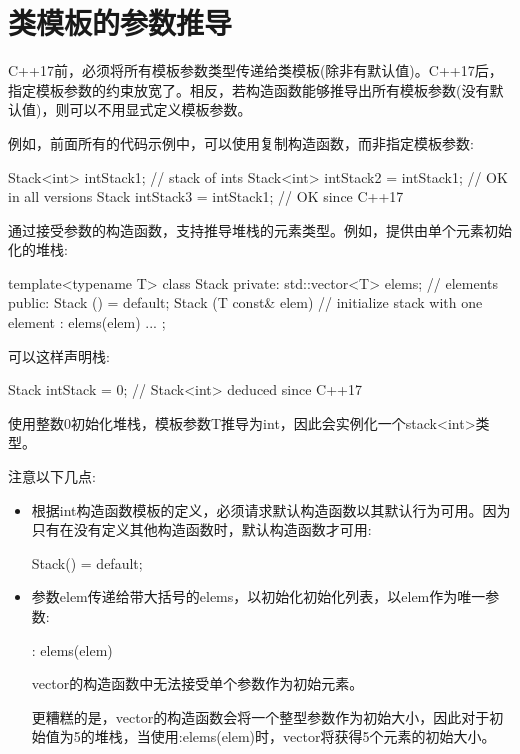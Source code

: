 \section{类模板的参数推导}

C++17前，必须将所有模板参数类型传递给类模板(除非有默认值)。C++17后，指定模板参数的约束放宽了。相反，若构造函数能够推导出所有模板参数(没有默认值)，则可以不用显式定义模板参数。

例如，前面所有的代码示例中，可以使用复制构造函数，而非指定模板参数:

\begin{cpp}
Stack<int> intStack1; // stack of ints
Stack<int> intStack2 = intStack1; // OK in all versions
Stack intStack3 = intStack1; // OK since C++17
\end{cpp}

通过接受参数的构造函数，支持推导堆栈的元素类型。例如，提供由单个元素初始化的堆栈:

\begin{cpp}
template<typename T>
class Stack {
private:
	std::vector<T> elems; // elements
public:
	Stack () = default;
	Stack (T const& elem) // initialize stack with one element
	: elems({elem}) {
	}
	...
};
\end{cpp}

可以这样声明栈:

\begin{cpp}
Stack intStack = 0; // Stack<int> deduced since C++17
\end{cpp}

使用整数0初始化堆栈，模板参数T推导为int，因此会实例化一个stack<int>类型。

注意以下几点:

\begin{itemize}
\item 
根据int构造函数模板的定义，必须请求默认构造函数以其默认行为可用。因为只有在没有定义其他构造函数时，默认构造函数才可用:
\begin{cpp}
Stack() = default;
\end{cpp}

\item 
参数elem传递给带大括号的elems，以初始化初始化列表，以elem作为唯一参数:
\begin{cpp}
: elems({elem})
\end{cpp}
vector的构造函数中无法接受单个参数作为初始元素。

\begin{notice}
更糟糕的是，vector的构造函数会将一个整型参数作为初始大小，因此对于初始值为5的堆栈，当使用:elems(elem)时，vector将获得5个元素的初始大小。
\end{notice}

\end{itemize}

